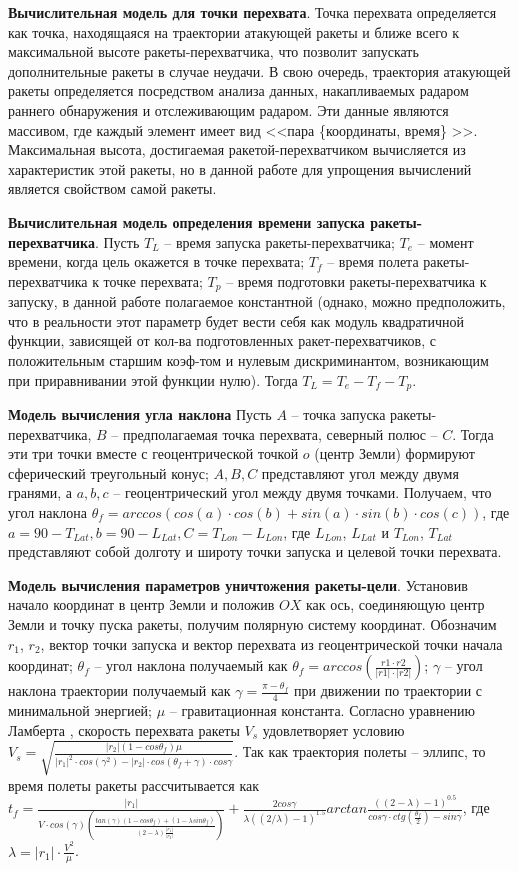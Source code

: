 \textbf{Вычислительная модель для точки перехвата}.
Точка перехвата определяется как точка, находящаяся на траектории атакующей ракеты и ближе всего к максимальной высоте ракеты-перехватчика, что позволит запускать дополнительные ракеты в случае неудачи. В свою очередь, траектория атакующей ракеты определяется посредством анализа данных, накапливаемых радаром раннего обнаружения и отслеживающим радаром. Эти данные являются массивом, где каждый элемент имеет вид  <<пара \{координаты, время\} >>.  Максимальная высота, достигаемая ракетой-перехватчиком вычисляется из характеристик этой ракеты, но в данной работе для упрощения вычислений является свойством самой ракеты.

\textbf{Вычислительная модель определения времени запуска ракеты-перехватчика}.
Пусть $T_L$ -- время запуска ракеты-перехватчика; $T_e$ -- момент времени, когда цель окажется в точке перехвата; $T_f$ -- время полета ракеты-перехватчика к точке перехвата; $T_p$ -- время подготовки ракеты-перехватчика к запуску, в данной работе полагаемое константной (однако, можно предположить, что в реальности этот параметр будет вести себя как  модуль квадратичной функции, зависящей от кол-ва подготовленных ракет-перехватчиков, с положительным старшим коэф-том и нулевым дискриминантом, возникающим при приравнивании этой функции нулю). Тогда $T_L = T_e - T_f - T_p$.

\textbf{Модель вычисления угла наклона}
Пусть $A$ -- точка запуска ракеты-перехватчика, $B$ -- предполагаемая точка перехвата, северный полюс --  $C$. Тогда эти три точки вместе с геоцентрической точкой $o$ (центр Земли) формируют сферический треугольный конус; $A, B, C$ представляют угол между двумя гранями, а $a,b,c$  -- геоцентрический угол между двумя точками. Получаем, что угол наклона $\theta_f=arccos(cos(a) \cdot cos(b)+sin(a) \cdot sin(b) \cdot cos(c))$, где 
$a=90-T_{Lat}, b=90-L_{Lat}, C=T_{Lon}-L_{Lon}$, где $L_{Lon}$, $L_{Lat}$ и  $T_{Lon}$, $T_{Lat}$ представляют собой долготу и широту точки запуска и целевой точки перехвата.

\textbf{Модель вычисления параметров уничтожения ракеты-цели}.
Установив начало координат в центр Земли и положив $OX$ как ось, соединяющую центр Земли и точку пуска ракеты, получим полярную систему координат. Обозначим $r_1$, $r_2$, вектор точки запуска и вектор перехвата из геоцентрической точки начала координат; $\theta_f$ -- угол наклона получаемый как $\theta_f = arccos(\frac{r1 \cdot r2}{|r1| \cdot |r2|})$; $\gamma$ -- угол наклона траектории получаемый как $\gamma = \frac{\pi - \theta_f}{4}$ при движении по траектории с минимальной энергией; $\mu$ -- гравитационная константа.    Согласно уравнению Ламберта \cite{Gooding:1990}, скорость перехвата ракеты $V_s$ удовлетворяет условию 
$V_s = \sqrt{\frac{|r_2|(1-cos \theta_f)\mu}{|r_1|^2 \cdot cos(\gamma ^ 2) - |r_2| \cdot  cos(\theta_f + \gamma) \cdot cos \gamma}}$.
Так как траектория полеты -- эллипс, то время полеты ракеты рассчитывается как
$t_f = \frac{|r_1|}{V \cdot cos(\gamma) (\frac{tan(\gamma) (1-cos \theta_f) + (1-\lambda sin \theta_f)}{(2-\lambda)  \frac{|r_1|}{|r_2|}})} + \frac{2cos \gamma}{\lambda ((2/ \lambda) - 1)^{1.5}} arctan \frac{((2-\lambda) - 1) ^ {0.5}}{cos \gamma \cdot ctg(\frac{\theta_f}{2}) - sin \gamma}$, где $\lambda = |r_1| \cdot \frac{V^2}{\mu} $. 


